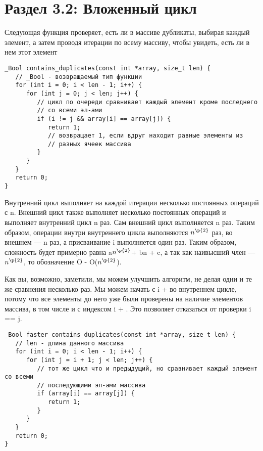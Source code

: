\vspace{\baselineskip}

\section*{Раздел 3.2: Вложенный цикл}

\vspace{\baselineskip}
Следующая функция проверяет, есть ли в массиве дубликаты, выбирая каждый элемент, а затем проводя итерации по всему массиву, чтобы увидеть, есть ли в нем этот элемент

\vspace{\baselineskip}
\begin{tcolorbox}
\begin{verbatim}
_Bool contains_duplicates(const int *array, size_t len) {
   // _Bool - возвращаемый тип функции
   for (int i = 0; i < len - 1; i++) {
      for (int j = 0; j < len; j++) {
         // цикл по очереди сравнивает каждый элемент кроме последнего 
         // со всеми эл-ами
         if (i != j && array[i] == array[j]) {
            return 1;
            // возвращает 1, если вдруг находит равные элементы из
            // разных ячеек массива
         }
      }
   }
   return 0;
}

\end{verbatim}
\end{tcolorbox}

\vspace{\baselineskip}
Внутренний цикл выполняет на каждой итерации несколько постоянных операций с n. Внешний цикл также выполняет несколько постоянных операций и выполняет внутренний цикл n раз. Сам внешний цикл выполняется n раз. Таким образом, операции внутри внутреннего цикла выполняются $n^{\p{2}}$ раз, во внешнем --- n раз, а присваивание i выполняется один раз. Таким образом, сложность будет примерно равна a$n^{\p{2}}$+ bn + c, а так как наивысший член --- $n^{\p{2}}$, то обозначение O - O($n^{\p{2}}$). 

\vspace{\baselineskip}
Как вы, возможно, заметили, мы можем улучшить алгоритм, не делая одни и те же сравнения несколько раз. Мы можем начать с i +  во внутреннем цикле, потому что все элементы до него уже были проверены на наличие элементов массива, в том числе и с индексом i + . Это позволяет отказаться от проверки i == j.

\vspace{\baselineskip}
\begin{tcolorbox}
\begin{verbatim}
_Bool faster_contains_duplicates(const int *array, size_t len) {
   // len - длина данного массива
   for (int i = 0; i < len - 1; i++) {
      for (int j = i + 1; j < len; j++) {
         // тот же цикл что и предыдущий, но сравнивает каждый элемент со всеми
         // последующими эл-ами массива
         if (array[i] == array[j]) {
            return 1;
         }
      }
   }
   return 0;
}

\end{verbatim}
\end{tcolorbox}

